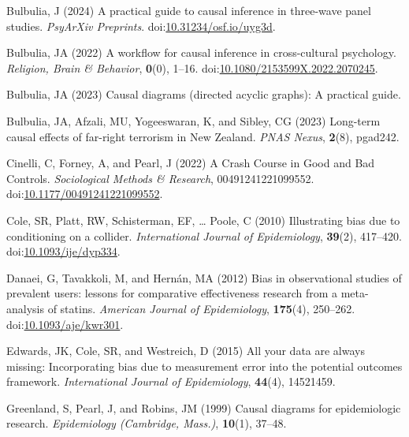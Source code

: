 \documentclass[
  singlecolumn]{article}
\newlength{\cslhangindent}
\newenvironment{CSLReferences}[2] %
 {\begin{list}{}{%
  \setlength{\itemindent}{0pt}
  \setlength{\leftmargin}{0pt}
  \setlength{\parsep}{0pt}
  \ifodd #1
   \setlength{\leftmargin}{\cslhangindent}
   \setlength{\itemindent}{-1\cslhangindent}
  \fi
  \setlength{\itemsep}{#2\baselineskip}}}
 {\end{list}}
\begin{document}
\label{refs}
\begin{CSLReferences}{1}{0}
Bulbulia, J (2024) A practical guide to causal inference in three-wave
panel studies. \emph{PsyArXiv Preprints}.
doi:\href{https://doi.org/10.31234/osf.io/uyg3d}{10.31234/osf.io/uyg3d}.

Bulbulia, JA (2022) A workflow for causal inference in cross-cultural
psychology. \emph{Religion, Brain \& Behavior}, \textbf{0}(0), 1--16.
doi:\href{https://doi.org/10.1080/2153599X.2022.2070245}{10.1080/2153599X.2022.2070245}.

Bulbulia, JA (2023) Causal diagrams (directed acyclic graphs): A
practical guide.

Bulbulia, JA, Afzali, MU, Yogeeswaran, K, and Sibley, CG (2023)
Long-term causal effects of far-right terrorism in {N}ew {Z}ealand.
\emph{PNAS Nexus}, \textbf{2}(8), pgad242.

Cinelli, C, Forney, A, and Pearl, J (2022) A Crash Course in Good and
Bad Controls. \emph{Sociological Methods \& Research},
00491241221099552.
doi:\href{https://doi.org/10.1177/00491241221099552}{10.1177/00491241221099552}.

Cole, SR, Platt, RW, Schisterman, EF, \ldots{} Poole, C (2010)
Illustrating bias due to conditioning on a collider. \emph{International
Journal of Epidemiology}, \textbf{39}(2), 417--420.
doi:\href{https://doi.org/10.1093/ije/dyp334}{10.1093/ije/dyp334}.

Danaei, G, Tavakkoli, M, and Hernán, MA (2012) Bias in observational
studies of prevalent users: lessons for comparative effectiveness
research from a meta-analysis of statins. \emph{American Journal of
Epidemiology}, \textbf{175}(4), 250--262.
doi:\href{https://doi.org/10.1093/aje/kwr301}{10.1093/aje/kwr301}.

Edwards, JK, Cole, SR, and Westreich, D (2015) All your data are always
missing: Incorporating bias due to measurement error into the potential
outcomes framework. \emph{International Journal of Epidemiology},
\textbf{44}(4), 14521459.

Greenland, S, Pearl, J, and Robins, JM (1999) Causal diagrams for
epidemiologic research. \emph{Epidemiology (Cambridge, Mass.)},
\textbf{10}(1), 37--48.


\end{CSLReferences}
\end{document}
